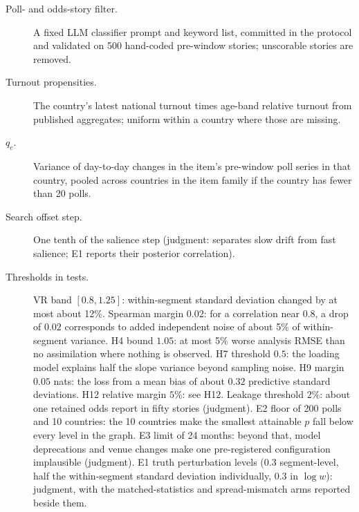\documentclass[10pt]{article}
\theoremstyle{remark}
\begin{document}
\begin{description}
\item[Poll- and odds-story filter.] A fixed LLM classifier prompt and keyword list, committed in the protocol and validated on 500 hand-coded pre-window stories; unscorable stories are removed.
\item[Turnout propensities.] The country's latest national turnout times age-band relative turnout from published aggregates; uniform within a country where those are missing.
\item[$q_e$.] Variance of day-to-day changes in the item's pre-window poll series in that country, pooled across countries in the item family if the country has fewer than 20 polls.
\item[Search offset step.] One tenth of the salience step (judgment: separates slow drift from fast salience; E1 reports their posterior correlation).
\item[Thresholds in tests.] VR band $[0.8,1.25]$: within-segment standard deviation changed by at most about 12\%. Spearman margin $0.02$: for a correlation near $0.8$, a drop of $0.02$ corresponds to added independent noise of about 5\% of within-segment variance. H4 bound $1.05$: at most 5\% worse analysis RMSE than no assimilation where nothing is observed. H7 threshold $0.5$: the loading model explains half the slope variance beyond sampling noise. H9 margin $0.05$ nats: the loss from a mean bias of about $0.32$ predictive standard deviations. H12 relative margin $5\%$: see H12. Leakage threshold $2\%$: about one retained odds report in fifty stories (judgment). E2 floor of 200 polls and 10 countries: the 10 countries make the smallest attainable $p$ fall below every level in the graph. E3 limit of 24 months: beyond that, model deprecations and venue changes make one pre-registered configuration implausible (judgment). E1 truth perturbation levels ($0.3$ segment-level, half the within-segment standard deviation individually, $0.3$ in $\log w$): judgment, with the matched-statistics and spread-mismatch arms reported beside them.
\end{description}

\renewcommand{\bibfont}{\raggedright}


\end{document}
